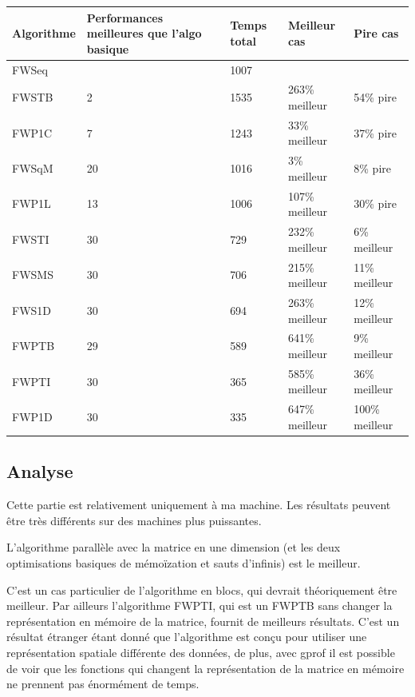 \documentclass[a4paper,11pt]{article}
\begin{document}
\begin{center}
  \begin{tabular}{p{2cm} | p{4.5cm} | p{2cm} | p{3cm} | p{3cm}}
    \centering \textbf{Algorithme} & \centering \textbf {Performances meilleures que l'algo basique} & \centering \textbf{Temps total} & \centering \textbf{Meilleur cas} & \centering \textbf{Pire cas} \tabularnewline
    \hline
    FWSeq & & 1007 & & \\
    \hline
    \hline
    FWSTB & 2 & 1535 & 263\% meilleur & 54\% pire \\
    \hline
    FWP1C & 7 & 1243 & 33\% meilleur & 37\% pire \\
    \hline
    FWSqM & 20 & 1016 & 3\% meilleur & 8\% pire \\
    \hline
    FWP1L & 13 & 1006 & 107\% meilleur & 30\% pire \\
    \hline
    FWSTI & 30 & 729 & 232\% meilleur & 6\% meilleur \\
    \hline
    FWSMS & 30 & 706 & 215\% meilleur & 11\% meilleur \\
    \hline
    FWS1D & 30 & 694 & 263\% meilleur & 12\% meilleur \\
    \hline
    FWPTB & 29 & 589 & 641\% meilleur & 9\% meilleur \\
    \hline
    FWPTI & 30 & 365 & 585\% meilleur & 36\% meilleur \\
    \hline
    FWP1D & 30 & 335 & 647\% meilleur & 100\% meilleur \\
    \hline
  \end{tabular}
\end{center}

\subsection{Analyse}

\indent Cette partie est relativement uniquement à ma machine. Les résultats peuvent être très différents sur des machines plus puissantes.

L'algorithme parallèle avec la matrice en une dimension (et les deux optimisations basiques de mémoïzation et sauts d'infinis) est le meilleur.

C'est un cas particulier de l'algorithme en blocs, qui devrait théoriquement être meilleur. Par ailleurs l'algorithme FWPTI, qui est un FWPTB sans changer la représentation en mémoire de la matrice, fournit de meilleurs résultats. C'est un résultat étranger étant donné que l'algorithme est conçu pour utiliser une représentation spatiale différente des données, de plus, avec gprof il est possible de voir que les fonctions qui changent la représentation de la matrice en mémoire ne prennent pas énormément de temps.
\end{document}
